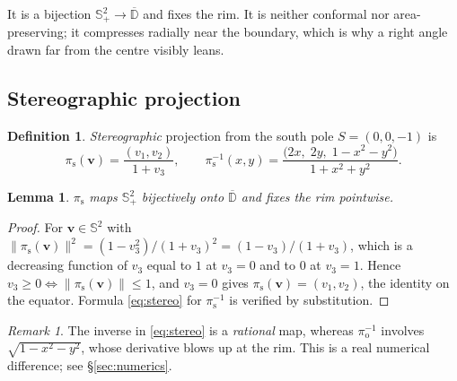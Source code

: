 \documentclass[11pt,a4paper]{article}
\newcommand{\Sph}{\mathbb{S}^2}
\newcommand{\D}{\mathbb{D}}
\newcommand{\Hemi}{\mathbb{S}^{2}_{+}}
\newcommand{\proj}[1]{\pi_{\mathrm{#1}}}
\newcommand{\po}{\proj{o}}
\newcommand{\ps}{\proj{s}}
\newcommand{\vv}{\mathbf{v}}
\newcommand{\norm}[1]{\lVert #1 \rVert}
\theoremstyle{plain}
\newtheorem{lemma}[proposition]{Lemma}
\theoremstyle{definition}
\newtheorem{definition}[proposition]{Definition}
\theoremstyle{remark}
\newtheorem{remark}[proposition]{Remark}
\begin{document}
It is a bijection $\Hemi\to\overline{\D}$ and fixes the rim. It is neither
conformal nor area-preserving; it compresses radially near the boundary, which
is why a right angle drawn far from the centre visibly leans.

\subsection{Stereographic projection}

\begin{definition}
\emph{Stereographic} projection from the south pole $S=(0,0,-1)$ is
\begin{equation}
  \label{eq:stereo}
  \ps(\vv)=\frac{(v_1,v_2)}{1+v_3},
  \qquad
  \ps^{-1}(x,y)=\frac{\bigl(2x,\;2y,\;1-x^2-y^2\bigr)}{1+x^2+y^2}.
\end{equation}
\end{definition}

\begin{lemma}
$\ps$ maps $\Hemi$ bijectively onto $\overline{\D}$ and fixes the rim
pointwise.
\end{lemma}

\begin{proof}
For $\vv\in\Sph$ with $\norm{\ps(\vv)}^2=(1-v_3^2)/(1+v_3)^2=(1-v_3)/(1+v_3)$,
which is a decreasing function of $v_3$ equal to $1$ at $v_3=0$ and to $0$ at
$v_3=1$. Hence $v_3\ge0 \iff \norm{\ps(\vv)}\le1$, and $v_3=0$ gives
$\ps(\vv)=(v_1,v_2)$, the identity on the equator. Formula \eqref{eq:stereo} for
$\ps^{-1}$ is verified by substitution.
\end{proof}

\begin{remark}
The inverse in \eqref{eq:stereo} is a \emph{rational} map, whereas
$\po^{-1}$ involves $\sqrt{1-x^2-y^2}$, whose derivative blows up at the rim.
This is a real numerical difference; see \S\ref{sec:numerics}.
\end{remark}
\end{document}
